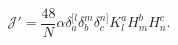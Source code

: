 \begin{equation}
\mathcal{J}'=\frac{48}{N}  \alpha
\delta^{[l}_a\delta^{m}_b\delta^{n]}_c K^a_lH^b_mH^c_n.
\end{equation}


